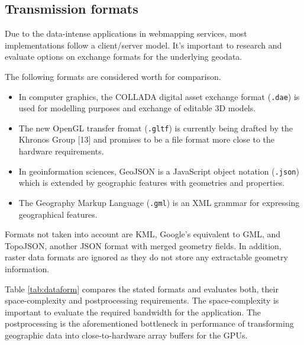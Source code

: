     \subsection{Transmission formats}
      Due to the data-intense applications in webmapping services, most implementations follow a client/server model. It's important to research and evaluate options on exchange formats for the underlying geodata.\par
      The following formats are considered worth for comparison.
      \begin{itemize}
      \item In computer graphics, the COLLADA digital asset exchange format (\texttt{.dae}) is used for modelling purposes and exchange of editable 3D models.
      \item The new OpenGL transfer fromat (\texttt{.gltf}) is currently being drafted by the Khronos Group [13] and promises to be a file format more close to the hardware requirements.
      \item In geoinformation sciences, GeoJSON is a JavaScript object notation (\texttt{.json}) which is extended by geographic features with geometries and properties.
      \item The Geography Markup Language (\texttt{.gml}) is an XML grammar for expressing geographical features.
      \end{itemize}
      Formats not taken into account are KML, Google's equivalent to GML, and TopoJSON, another JSON format with merged geometry fields. In addition, raster data formats are ignored as they do not store any extractable geometry information.\par
      Table \ref{tab:dataform} compares the stated formats and evaluates both, their space-complexity and postprocessing requirements. The space-complexity is important to evaluate the required bandwidth for the application. The postprocessing is the aforementioned bottleneck in performance of transforming geographic data into close-to-hardware array buffers for the GPUs.\par

